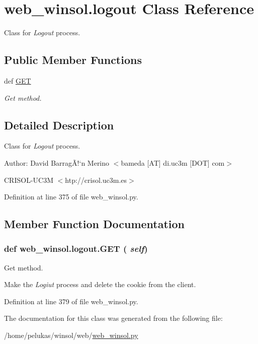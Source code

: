 \hypertarget{classweb__winsol_1_1logout}{
\section{web\_\-winsol.logout Class Reference}
\label{classweb__winsol_1_1logout}
}
Class for {\em Logout\/} process.  


\subsection*{Public Member Functions}
\begin{CompactItemize}
\item 
def \hyperlink{classweb__winsol_1_1logout_7b6f92d097e4a031e269bfd55eb81532}{GET}
\begin{CompactList}\small\item\em Get method. \item\end{CompactList}\end{CompactItemize}


\subsection{Detailed Description}
Class for {\em Logout\/} process. 

\begin{Desc}
\item[Author:]David Barrag\~{A}!`n Merino $<$bameda \mbox{[}AT\mbox{]} di.uc3m \mbox{[}DOT\mbox{]} com$>$ 

CRISOL-UC3M $<$htp://crisol.uc3m.es$>$ \end{Desc}




Definition at line 375 of file web\_\-winsol.py.

\subsection{Member Function Documentation}
\hypertarget{classweb__winsol_1_1logout_7b6f92d097e4a031e269bfd55eb81532}{
\subsubsection[GET]{\setlength{\rightskip}{0pt plus 5cm}def web\_\-winsol.logout.GET ( {\em self})}}
\label{classweb__winsol_1_1logout_7b6f92d097e4a031e269bfd55eb81532}


Get method. 

Make the {\em Logiut\/} process and delete the cookie from the client. 

Definition at line 379 of file web\_\-winsol.py.

The documentation for this class was generated from the following file:\begin{CompactItemize}
\item 
/home/pelukas/winsol/web/\hyperlink{web__winsol_8py}{web\_\-winsol.py}\end{CompactItemize}
